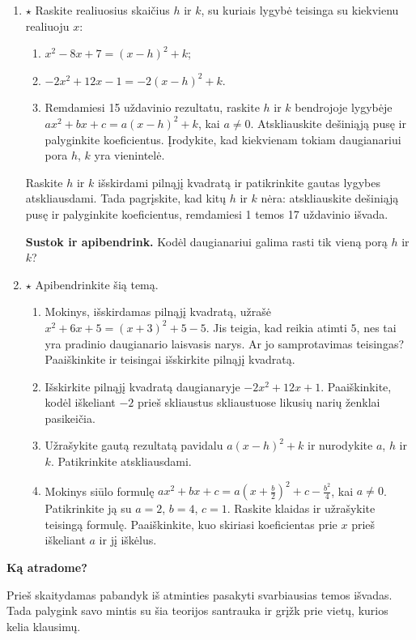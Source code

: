 \documentclass[12pt,a4paper]{article}
\begin{document}
\begin{enumerate}
\textbf{Sustok ir apibendrink.} Kaip iš koeficientų $a$, $b$ ir $c$ rasti skaičius $h$ ir $k$? Kodėl būtina sąlyga $a\ne0$?

\item $\star$ Raskite realiuosius skaičius $h$ ir $k$, su kuriais lygybė teisinga su kiekvienu realiuoju $x$:
\begin{enumerate}
\item $x^2-8x+7=(x-h)^2+k$;
\item $-2x^2+12x-1=-2(x-h)^2+k$.
\item Remdamiesi 15 uždavinio rezultatu, raskite $h$ ir $k$ bendrojoje lygybėje $ax^2+bx+c=a(x-h)^2+k$, kai $a\ne0$. Atskliauskite dešiniąją pusę ir palyginkite koeficientus. Įrodykite, kad kiekvienam tokiam daugianariui pora $h$, $k$ yra vienintelė.
\end{enumerate}
Raskite $h$ ir $k$ išskirdami pilnąjį kvadratą ir patikrinkite gautas lygybes atskliausdami. Tada pagrįskite, kad kitų $h$ ir $k$ nėra: atskliauskite dešiniąją pusę ir palyginkite koeficientus, remdamiesi 1 temos 17 uždavinio išvada.

\textbf{Sustok ir apibendrink.} Kodėl daugianariui galima rasti tik vieną porą $h$ ir $k$?

\item $\star$ Apibendrinkite šią temą.
\begin{enumerate}
\item Mokinys, išskirdamas pilnąjį kvadratą, užrašė $x^2+6x+5=(x+3)^2+5-5$. Jis teigia, kad reikia atimti $5$, nes tai yra pradinio daugianario laisvasis narys. Ar jo samprotavimas teisingas? Paaiškinkite ir teisingai išskirkite pilnąjį kvadratą.
\item Išskirkite pilnąjį kvadratą daugianaryje $-2x^2+12x+1$. Paaiškinkite, kodėl iškeliant $-2$ prieš skliaustus skliaustuose likusių narių ženklai pasikeičia.
\item Užrašykite gautą rezultatą pavidalu $a(x-h)^2+k$ ir nurodykite $a$, $h$ ir $k$. Patikrinkite atskliausdami.
\item Mokinys siūlo formulę $ax^2+bx+c=a(x+\frac b2)^2+c-\frac{b^2}{4}$, kai $a\ne0$. Patikrinkite ją su $a=2$, $b=4$, $c=1$. Raskite klaidas ir užrašykite teisingą formulę. Paaiškinkite, kuo skiriasi koeficientas prie $x$ prieš iškeliant $a$ ir jį iškėlus.
\end{enumerate}
\end{enumerate}
\newpage
\begin{center}{\Large\bfseries Ką atradome?}\end{center}
Prieš skaitydamas pabandyk iš atminties pasakyti svarbiausias temos išvadas. Tada palygink savo mintis su šia teorijos santrauka ir grįžk prie vietų, kurios kelia klausimų.
\end{document}
